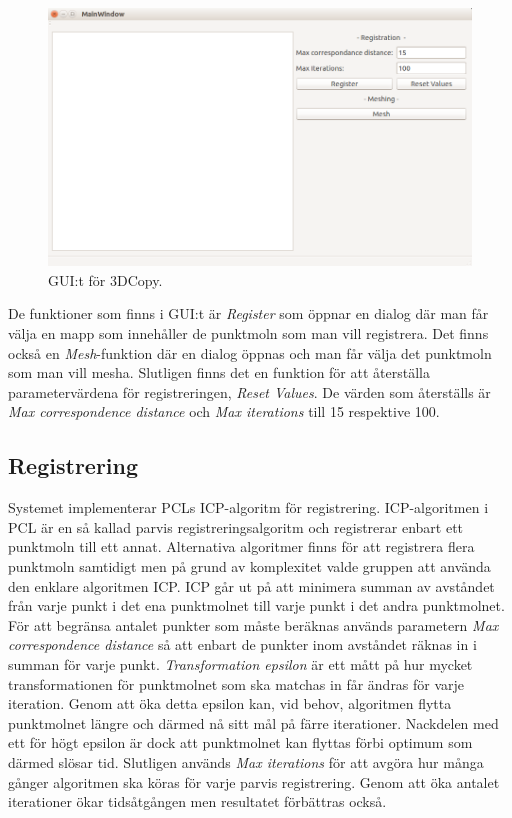\begin{figure}[H]
	\centering
	\includegraphics[width=130mm]{figures/3DCopyGUI.PNG}
	\caption{GUI:t för 3DCopy.}
	\label{fig:3dcopy_gui_res}
\end{figure}

De funktioner som finns i GUI:t är \textit{Register} som öppnar en dialog där man får välja en mapp som innehåller de punktmoln som man vill registrera. Det finns också en \textit{Mesh}-funktion där en dialog öppnas och man får välja det punktmoln som man vill mesha. Slutligen finns det en funktion för att återställa parametervärdena för registreringen, \textit{Reset Values}. De värden som återställs är \textit{Max correspondence distance} och \textit{Max iterations} till 15 respektive 100.

\subsection{Registrering}
Systemet implementerar PCLs ICP-algoritm för registrering. ICP-algoritmen i PCL är en så kallad parvis registreringsalgoritm och registrerar enbart ett punktmoln till ett annat. Alternativa algoritmer finns för att registrera flera punktmoln samtidigt men på grund av komplexitet valde gruppen att använda den enklare algoritmen ICP. ICP går ut på att minimera summan av avståndet från varje punkt i det ena punktmolnet till varje punkt i det andra punktmolnet. För att begränsa antalet punkter som måste beräknas används parametern \textit{Max correspondence distance} så att enbart de punkter inom avståndet räknas in i summan för varje punkt. \textit{Transformation epsilon} är ett mått på hur mycket transformationen för punktmolnet som ska matchas in får ändras för varje iteration. Genom att öka detta epsilon kan, vid behov, algoritmen flytta punktmolnet längre och därmed nå sitt mål på färre iterationer. Nackdelen med ett för högt epsilon är dock att punktmolnet kan flyttas förbi optimum som därmed slösar tid. Slutligen används \textit{Max iterations} för att avgöra hur många gånger algoritmen ska köras för varje parvis registrering. Genom att öka antalet iterationer ökar tidsåtgången men resultatet förbättras också.

